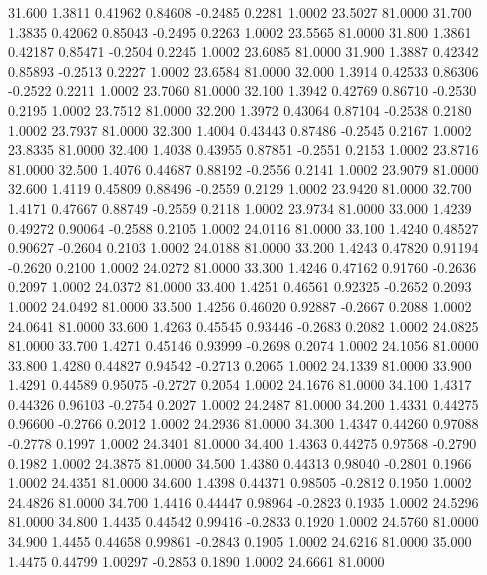   31.600   1.3811   0.41962   0.84608  -0.2485   0.2281   1.0002  23.5027  81.0000
  31.700   1.3835   0.42062   0.85043  -0.2495   0.2263   1.0002  23.5565  81.0000
  31.800   1.3861   0.42187   0.85471  -0.2504   0.2245   1.0002  23.6085  81.0000
  31.900   1.3887   0.42342   0.85893  -0.2513   0.2227   1.0002  23.6584  81.0000
  32.000   1.3914   0.42533   0.86306  -0.2522   0.2211   1.0002  23.7060  81.0000
  32.100   1.3942   0.42769   0.86710  -0.2530   0.2195   1.0002  23.7512  81.0000
  32.200   1.3972   0.43064   0.87104  -0.2538   0.2180   1.0002  23.7937  81.0000
  32.300   1.4004   0.43443   0.87486  -0.2545   0.2167   1.0002  23.8335  81.0000
  32.400   1.4038   0.43955   0.87851  -0.2551   0.2153   1.0002  23.8716  81.0000
  32.500   1.4076   0.44687   0.88192  -0.2556   0.2141   1.0002  23.9079  81.0000
  32.600   1.4119   0.45809   0.88496  -0.2559   0.2129   1.0002  23.9420  81.0000
  32.700   1.4171   0.47667   0.88749  -0.2559   0.2118   1.0002  23.9734  81.0000
  33.000   1.4239   0.49272   0.90064  -0.2588   0.2105   1.0002  24.0116  81.0000
  33.100   1.4240   0.48527   0.90627  -0.2604   0.2103   1.0002  24.0188  81.0000
  33.200   1.4243   0.47820   0.91194  -0.2620   0.2100   1.0002  24.0272  81.0000
  33.300   1.4246   0.47162   0.91760  -0.2636   0.2097   1.0002  24.0372  81.0000
  33.400   1.4251   0.46561   0.92325  -0.2652   0.2093   1.0002  24.0492  81.0000
  33.500   1.4256   0.46020   0.92887  -0.2667   0.2088   1.0002  24.0641  81.0000
  33.600   1.4263   0.45545   0.93446  -0.2683   0.2082   1.0002  24.0825  81.0000
  33.700   1.4271   0.45146   0.93999  -0.2698   0.2074   1.0002  24.1056  81.0000
  33.800   1.4280   0.44827   0.94542  -0.2713   0.2065   1.0002  24.1339  81.0000
  33.900   1.4291   0.44589   0.95075  -0.2727   0.2054   1.0002  24.1676  81.0000
  34.100   1.4317   0.44326   0.96103  -0.2754   0.2027   1.0002  24.2487  81.0000
  34.200   1.4331   0.44275   0.96600  -0.2766   0.2012   1.0002  24.2936  81.0000
  34.300   1.4347   0.44260   0.97088  -0.2778   0.1997   1.0002  24.3401  81.0000
  34.400   1.4363   0.44275   0.97568  -0.2790   0.1982   1.0002  24.3875  81.0000
  34.500   1.4380   0.44313   0.98040  -0.2801   0.1966   1.0002  24.4351  81.0000
  34.600   1.4398   0.44371   0.98505  -0.2812   0.1950   1.0002  24.4826  81.0000
  34.700   1.4416   0.44447   0.98964  -0.2823   0.1935   1.0002  24.5296  81.0000
  34.800   1.4435   0.44542   0.99416  -0.2833   0.1920   1.0002  24.5760  81.0000
  34.900   1.4455   0.44658   0.99861  -0.2843   0.1905   1.0002  24.6216  81.0000
  35.000   1.4475   0.44799   1.00297  -0.2853   0.1890   1.0002  24.6661  81.0000

